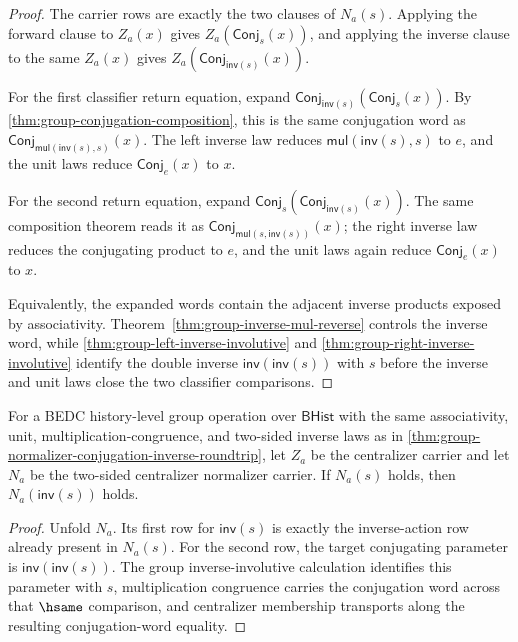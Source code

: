 \begin{proof}
The carrier rows are exactly the two clauses of $N_a(s)$. Applying the forward
clause to $Z_a(x)$ gives $Z_a(\mathsf{Conj}_s(x))$, and applying the inverse
clause to the same $Z_a(x)$ gives
$Z_a(\mathsf{Conj}_{\mathsf{inv}(s)}(x))$.

For the first classifier return equation, expand
$\mathsf{Conj}_{\mathsf{inv}(s)}(\mathsf{Conj}_s(x))$. By
\autoref{thm:group-conjugation-composition}, this is the same conjugation word
as $\mathsf{Conj}_{\mathsf{mul}(\mathsf{inv}(s),s)}(x)$. The left inverse law
reduces $\mathsf{mul}(\mathsf{inv}(s),s)$ to $e$, and the unit laws reduce
$\mathsf{Conj}_e(x)$ to $x$.

For the second return equation, expand
$\mathsf{Conj}_s(\mathsf{Conj}_{\mathsf{inv}(s)}(x))$. The same composition
theorem reads it as $\mathsf{Conj}_{\mathsf{mul}(s,\mathsf{inv}(s))}(x)$; the
right inverse law reduces the conjugating product to $e$, and the unit laws
again reduce $\mathsf{Conj}_e(x)$ to $x$.

Equivalently, the expanded words contain the adjacent inverse products exposed
by associativity. Theorem~\ref{thm:group-inverse-mul-reverse} controls the
inverse word, while \autoref{thm:group-left-inverse-involutive} and
\autoref{thm:group-right-inverse-involutive} identify the double inverse
$\mathsf{inv}(\mathsf{inv}(s))$ with $s$ before the inverse and unit laws close
the two classifier comparisons.
\end{proof}

\begin{theorem}
\label{thm:group-normalizer-inverse-closure}
For a BEDC history-level group operation over $\mathsf{BHist}$ with the same
associativity, unit, multiplication-congruence, and two-sided inverse laws as in
\autoref{thm:group-normalizer-conjugation-inverse-roundtrip}, let $Z_a$ be the
centralizer carrier and let $N_a$ be the two-sided centralizer normalizer
carrier. If $N_a(s)$ holds, then $N_a(\mathsf{inv}(s))$ holds.
\end{theorem}
\begin{proof}
Unfold $N_a$. Its first row for $\mathsf{inv}(s)$ is exactly the inverse-action
row already present in $N_a(s)$. For the second row, the target conjugating
parameter is $\mathsf{inv}(\mathsf{inv}(s))$. The group inverse-involutive
calculation identifies this parameter with $s$, multiplication congruence carries
the conjugation word across that $\hsame$ comparison, and centralizer membership
transports along the resulting conjugation-word equality.
\end{proof}

